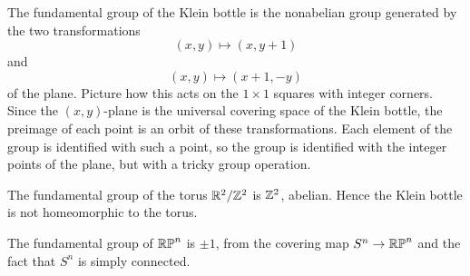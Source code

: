 \begin{example}
The fundamental group of the Klein bottle is the nonabelian group generated by the two transformations
\[
(x,y) \mapsto (x,y+1)
\]
and
\[
(x,y) \mapsto (x+1,-y)
\]
of the plane.
Picture how this acts on the \(1 \times 1\) squares with integer corners.
Since the \((x,y)\)-plane is the universal covering space of the Klein bottle, the preimage of each point is an orbit of these transformations.
Each element of the group is identified with such a point, so the group is identified with the integer points of the plane, but with a tricky group operation.
\end{example}
\begin{example}
The fundamental group of the torus \(\mathbb{R}^{2}/\mathbb{Z}^{2}\) is \(\mathbb{Z}^{2}\), abelian.
Hence the Klein bottle is not homeomorphic to the torus.
\end{example}
\begin{example}\label{example:rpn.pi.1}
The fundamental group of \(\mathbb{RP}^{n}\) is \(\pm 1\), from the covering map \(S^n \to \mathbb{RP}^{n}\) and the fact that \(S^n\) is simply connected.
\end{example}

